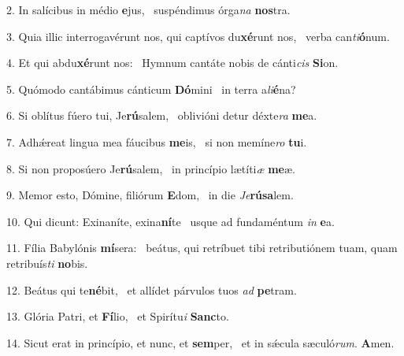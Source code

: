 2. In salícibus in médio \textbf{e}jus, \ast\  suspéndimus órga\textit{na} \textbf{nos}tra.\

3. Quia illic interrogavérunt nos, qui captívos du\textbf{xé}runt nos, \ast\  verba can\textit{ti}\textbf{ó}num.\

4. Et qui abdu\textbf{xé}runt nos: \ast\  Hymnum cantáte nobis de cánti\textit{cis} \textbf{Si}on.\

5. Quómodo cantábimus cánticum \textbf{Dó}mini \ast\  in terra a\textit{li}\textbf{é}na?\

6. Si oblítus fúero tui, Je\textbf{rú}salem, \ast\  oblivióni detur déxte\textit{ra} \textbf{me}a.\

7. Adhǽreat lingua mea fáucibus \textbf{me}is, \ast\  si non memíne\textit{ro} \textbf{tu}i.\

8. Si non proposúero Je\textbf{rú}salem, \ast\  in princípio lætíti\textit{æ} \textbf{me}æ.\

9. Memor esto, Dómine, filiórum \textbf{E}dom, \ast\  in die \textit{Je}\textbf{rú}\textbf{sa}lem.\

10. Qui dicunt: Exinaníte, exina\textbf{ní}te \ast\  usque ad fundaméntum \textit{in} \textbf{e}a.\

11. Fília Babylónis \textbf{mí}sera: \ast\  beátus, qui retríbuet tibi retributiónem tuam, quam retribuís\textit{ti} \textbf{no}bis.\

12. Beátus qui te\textbf{né}bit, \ast\  et allídet párvulos tuos \textit{ad} \textbf{pe}tram.\

13. Glória Patri, et \textbf{Fí}lio, \ast\  et Spirítu\textit{i} \textbf{Sanc}to.\

14. Sicut erat in princípio, et nunc, et \textbf{sem}per, \ast\  et in sǽcula sæculó\textit{rum}. \textbf{A}men.\

